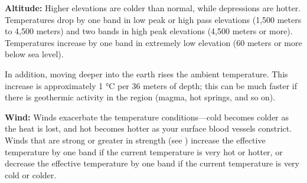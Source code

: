 \textbf{Altitude:} Higher elevations are colder than normal, while depressions are hotter. Temperatures drop by one band in low peak or high pass elevations (1,500 meters to 4,500 meters) and two bands in high peak elevations (4,500 meters or more). Temperatures increase by one band in extremely low elevation (60 meters or more below sea level).

In addition, moving deeper into the earth rises the ambient temperature. This increase is approximately 1 °C per 36 meters of depth; this can be much faster if there is geothermic activity in the region (magma, hot springs, and so on).

\textbf{Wind:} Winds exacerbate the temperature conditions---cold becomes colder as the heat is lost, and hot becomes hotter as your surface blood vessels constrict. Winds that are strong or greater in strength (see ) increase the effective temperature by one band if the current temperature is very hot or hotter, or decrease the effective temperature by one band if the current temperature is very cold or colder.


